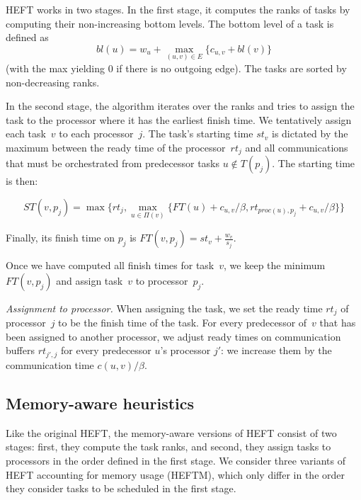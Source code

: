 \documentclass[conference]{IEEEtran}
\begin{document}
HEFT works in two stages.
In the first stage, it computes the ranks of tasks by computing their non-increasing bottom levels.
The bottom level of a task is defined as
\[
bl(u) = w_u + \max_{(u,v)\in E} \{c_{u,v} + bl(v)\}
\]
(with the max yielding $0$ if there is no outgoing edge).
The tasks are sorted by non-decreasing ranks.

In the second stage, the algorithm iterates over the ranks and tries to assign the task to the processor where it
has the earliest finish time.
We tentatively assign each task~$v$ to each processor~$j$.
The task's starting time $st_v$ is dictated by the maximum between the ready time of the processor~$rt_j$
and all communications that
must be orchestrated from predecessor tasks $u\notin T(p_j)$.
The starting time is then:

{\footnotesize{   \[ST(v, p_j) = \max{ \{rt_j, \max_{ u \in \Pi(v)}\{ FT(u)+ c_{u,v} / \beta , rt_{proc(u), p_j} + c_{u,v} / \beta  \} \} } \]}}

Finally, its finish time on $p_j$ is
$FT(v,p_j) = st_v + \frac{w_v}{s_j}$.

Once we have computed all finish times for task~$v$,
we keep the minimum $FT(v,p_j)$ and assign task~$v$
to processor~$p_j$.

\textit{Assignment to processor. }
When assigning the task, we set the ready time $rt_j$ of  processor~$j$ to be the finish time of the task.
For every predecessor of~$v$ that has been assigned to another processor, we adjust ready times on
communication buffers $rt_{j', j}$ for every predecessor $u$'s processor $j'$: we increase them by the
communication time $c( u,v) / \beta$.


\subsection{Memory-aware heuristics}
\label{sec.heftm}
%
Like the original HEFT, the memory-aware versions of HEFT consist of two stages:
first, they compute the task ranks,
and second, they assign tasks to processors in the order defined in the first stage.
We consider three variants of HEFT accounting for memory usage (HEFTM), which only
differ in the order they consider tasks to be scheduled in the first stage.

\smallskip
{}
\end{document}
